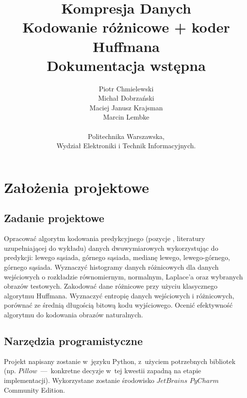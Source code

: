 

\title{Kompresja Danych \\ \Huge{Kodowanie różnicowe + koder Huffmana} \\ \Large{Dokumentacja wstępna} }
\author{ Piotr Chmielewski \\ Michał Dobrzański \\ Maciej Janusz Krajsman \\ Marcin Lembke \\ \\ Politechnika Warszawska, \\ Wydział Elektroniki i Technik Informacyjnych.}


\maketitle    

\section{Założenia projektowe}
\label{sec:zalozenia_projektowe}

\subsection{Zadanie projektowe}
\label{subsec:zadanie_projektowe}
Opracować algorytm kodowania predykcyjnego (pozycje \cite{Przelaskowski}, \cite{Sayood} literatury uzupełniającej do wykładu) danych dwuwymiarowych wykorzystując do predykcji: lewego sąsiada, górnego sąsiada, medianę lewego, lewego-górnego, górnego sąsiada. Wyznaczyć histogramy danych różnicowych dla danych wejściowych o rozkładzie równomiernym, normalnym, Laplace'a oraz wybranych obrazów testowych. Zakodować dane różnicowe przy użyciu klasycznego algorytmu Huffmana. Wyznaczyć entropię danych wejściowych i różnicowych, porównać ze średnią długością bitową kodu wyjściowego. Ocenić efektywność algorytmu do kodowania obrazów naturalnych. 

\subsection{Narzędzia programistyczne}
\label{subsec:narzedzia_programistyczne}
Projekt napisany zostanie w~języku Python, z~użyciem potrzebnych bibliotek (np. $Pillow$~---~konkretne decyzje w~tej kwestii zapadną na etapie implementacji). Wykorzystane zostanie środowisko $JetBrains$ $PyCharm$ Community Edition.

